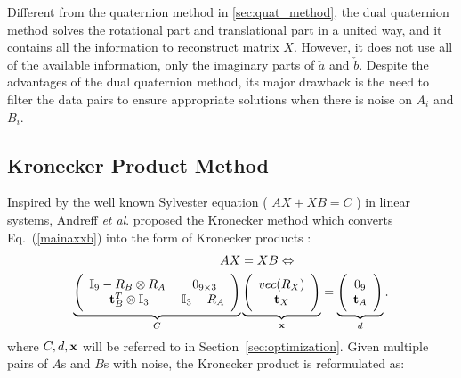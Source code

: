 \documentclass[twocolumn,10pt]{asme2ej}
\newcommand{\ttt}{{\bf t}}
\begin{document}
Different from the quaternion method in \ref{sec:quat_method}, the dual quaternion method solves the rotational part and translational part in a united way, and it contains all the information to reconstruct matrix $X$. However, it does not use all of the available information, only the imaginary parts of $\check{a}$ and $\check{b}$. Despite the advantages of the dual quaternion method, its major drawback is the need to filter the data pairs to ensure appropriate solutions when there is noise on $A_{i}$ and $B_{i}$.

\subsection{Kronecker Product Method }
\label{sec:Kronecker}
Inspired by the well known Sylvester equation ( $AX + XB = C$ ) in linear systems, Andreff {\it et al}. \cite{andreff1999line} proposed the Kronecker method which converts  Eq.~(\ref{mainaxxb}) into the form of Kronecker products \cite{andreff1999line}: %
\begin{equation}
\begin{split}
AX &= XB  \Leftrightarrow\\
\underbrace{\Bigg(
\begin{array}{cc}
\mathbb{I}_{9} - R_{B} \otimes R_{A} \; & \; 0_{9 \times 3}\\
\ttt_{B}^{T} \otimes \mathbb{I}_{3} & \mathbb{I}_{3} - R_{A}
\end{array}
\Bigg)}_{C}
&\underbrace{\Bigg(
\begin{array}{c}
vec(R_{X})\\
\ttt_{X}
\end{array}
\Bigg)}_{\bf x} =
\underbrace{
\Bigg(
\begin{array}{c}
0_{9}\\
\ttt_{A}
\end{array}
\Bigg)}_{d}.
\end{split}
\label{KroneckerMethod}
\end{equation}
where $C, d, \bf x$ will be referred to in Section~\ref{sec:optimization}. 
Given multiple pairs of $A$s and $B$s with noise, the Kronecker product is reformulated as:%
\end{document}
